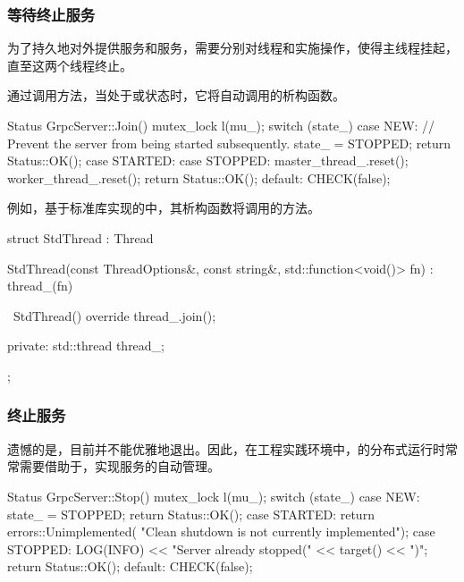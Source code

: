 \begin{content}
\subsubsection{等待终止服务}

为了持久地对外提供服务和服务，需要分别对线程和实施操作，使得主线程挂起，直至这两个线程终止。

通过调用方法，当处于或状态时，它将自动调用的析构函数。

\begin{leftbar}
\begin{c++}
Status GrpcServer::Join() {
  mutex_lock l(mu_);
  switch (state_) {
    case NEW:
      // Prevent the server from being started subsequently.
      state_ = STOPPED;
      return Status::OK();
    case STARTED:
    case STOPPED:
      master_thread_.reset();
      worker_thread_.reset();
      return Status::OK();
    default:
      CHECK(false);
  }
}
\end{c++}
\end{leftbar}

例如，基于标准库实现的中，其析构函数将调用的方法。

\begin{leftbar}
\begin{c++}
struct StdThread : Thread {
  StdThread(const ThreadOptions&, const string&, 
      std::function<void()> fn)
    : thread_(fn) {
  }

  ~StdThread() override { 
    thread_.join(); 
  }

 private:
  std::thread thread_;
};
\end{c++}
\end{leftbar}

\subsubsection{终止服务}

遗憾的是，目前并不能优雅地退出。因此，在工程实践环境中，\tf{}的分布式运行时常常需要借助于，实现服务的自动管理。

\begin{leftbar}
\begin{c++}
Status GrpcServer::Stop() {
  mutex_lock l(mu_);
  switch (state_) {
    case NEW:
      state_ = STOPPED;
      return Status::OK();
    case STARTED:
      return errors::Unimplemented(
          "Clean shutdown is not currently implemented");
    case STOPPED:
      LOG(INFO) << "Server already stopped(" << target() << ")";
      return Status::OK();
    default:
      CHECK(false);
  }
}
\end{c++}
\end{leftbar}

\end{content}

